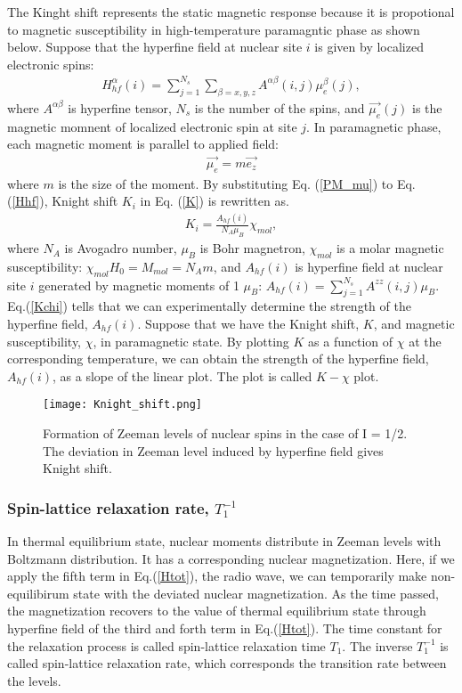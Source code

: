 \documentclass[a4,10.5pt]{report}
\begin{document}
The Kinght shift represents the static magnetic response because it is propotional to magnetic susceptibility in high-temperature paramagntic phase as shown below.
Suppose that the hyperfine field at nuclear site $i$ is given by localized electronic spins:
\begin{align}
\label{Hhf}
H^\alpha_{hf}(i) = \sum^{N_s}_{j = 1}\sum_{\beta = x,y,z}A^{\alpha\beta}(i, j)\mu^\beta_e(j),
\end{align}
where $A^{\alpha\beta}$ is hyperfine tensor, $N_s$ is the number of the spins, and $\vec{\mu_e}(j)$ is the magnetic momnent of localized electronic spin at site $j$.
In paramagnetic phase, each magnetic moment is parallel to applied field: 
\begin{align}
\label{PM_mu}
\vec{\mu_e} = m\vec{e_z}
\end{align}
where $m$ is the size of the moment.
By substituting Eq. (\ref{PM_mu}) to Eq. (\ref{Hhf}), Knight shift $K_i$ in Eq. (\ref{K}) is rewritten as.
\begin{align}
K_i = \frac{A_{hf}(i)}{N_A\mu_B}\chi_{mol},
\label{Kchi}
\end{align}
where $N_A$ is Avogadro number, $\mu_B$ is Bohr magnetron, $\chi_{mol}$ is a molar magnetic susceptibility: $\chi_{mol} H_0 = M_{mol} = N_A m$,
and $A_{hf}(i)$ is hyperfine field at nuclear site $i$ generated by magnetic moments of 1 $\mu_B$: $A_{hf}(i) = \sum^{N_s}_{j = 1}A^{zz}(i, j)\mu_B$.
Eq.(\ref{Kchi}) tells that we can experimentally determine the strength of the hyperfine field, $A_{hf}(i)$.
Suppose that we have the Knight shift, $K$, and magnetic susceptibility, $\chi$, in paramagnetic state.
By plotting $K$ as a function of $\chi$ at the corresponding temperature, we can obtain the strength of the hyperfine field, $A_{hf}(i)$, as a slope of the linear plot.
The plot is called $K-\chi$ plot.

\begin{figure}
  \centering
  \texttt{[image: Knight\_shift.png]}
  \caption{Formation of Zeeman levels of nuclear spins in the case of I = 1/2.
  The deviation in Zeeman level induced by hyperfine field gives Knight shift.}
  \label{Knight_shift}
\end{figure}



\subsubsection{Spin-lattice relaxation rate, $T^{-1}_1$}
In thermal equilibrium state, nuclear moments distribute in Zeeman levels with Boltzmann distribution.
It has a corresponding nuclear magnetization.
Here, if we apply the fifth term in Eq.(\ref{Htot}), the radio wave, we can temporarily make non-equilibirum state with the deviated nuclear magnetization.
As the time passed, the magnetization recovers to the value of thermal equilibrium state through hyperfine field of the third and forth term in Eq.(\ref{Htot}).
The time constant for the relaxation process is called spin-lattice relaxation time $T_1$.
The inverse $T^{-1}_1$ is called spin-lattice relaxation rate, which corresponds the transition rate between the levels.
\end{document}
